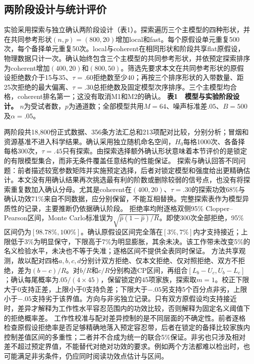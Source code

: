 \subsection{两阶段设计与统计评价}
实验采用探索与独立确认两阶段设计（表1）。探索遍历三个主模型的四种形状，并在共同参考形状$(n,p)=(800,20)$增加local和fast。每个原假设单元重复500次，每个备择单元重复50次。local与coherent在相同形状和阶段共享flat原假设，物理数据只计一次。确认始终包含三个主模型的共同参考形状，并依预定探索排序为coherent增加$(400,20)$和$(800,50)$。筛选先要求本文在共同参考形状的原假设拒绝数介于15与35、$\tau=.60$拒绝数至少40；再按三个排序形状的入带数量、距25次拒绝的最大偏离、$\tau=.30$总拒绝数及固定模型次序排序。三个主模型均合格，coherent排名第一；这没有取消M1和M2的确认。
\textbf{表1　模型与实验阶段设计。} $n$为受试者数，$p$为通道数；全部模型共用$M=64$、噪声标准差$.05$、$B=500$及$\alpha=.05$。

两阶段共18,800份正式数据、356条方法汇总和213项配对比较，分别分析；冒烟和资源基准不进入科学结果。确认采用独立随机命名空间，$H_0$每格1000次、各备择每格300次，$\tau=.45$只有探索。由探索选择额外确认形状意味着本节评价的是锁定的有限模型集合，而非无条件覆盖任意结构的性能保证。
探索与确认回答不同问题：前者描述较宽参数矩阵并实施预定选择，后者对锁定模型和强度给出更精确估计。本文没有用确认结果再次挑选最有利的阶数或删除较弱的信号点，也没有将探索重复数加入确认分母。尤其是coherent在$(400,20)$、$\tau=.30$的探索功效68\%与确认功效71\%来自不同数据，应分别保留，不能互相替换。完整探索表作为模型异质性的记录，主要推断仍依据确认阶段。
拒绝率均附逐格双侧95\% Clopper–Pearson区间，Monte Carlo标准误为$\sqrt{\widehat p(1-\widehat p)/R}$。即使300次全部拒绝，95\%区间仍为$[98.78\%,100\%]$。确认原假设区间完全落在$[3\%,7\%]$内才支持接近；上限低于3\%为明显保守，下限高于7\%为明显膨胀，其余未决。该工作带未改变5\%的名义检验水平，未决也不等于失准；逐格区间不提供全表同时保证。
方法共享观测，故以配对四格$a,b,c,d$分别计双方拒绝、仅本文拒绝、仅对照拒绝、双方不拒绝，差为$(b-c)/R$。对$b/R$和$c/R$分别构造CP区间，再组合$[L_b-U_c,U_b-L_c]$；确认每尾概率为$.05/(4\times45)$，保留锁定的45项家族，探索取$m=1$。校正下限大于0支持正差，上限小于0支持负差；下限大于$-.05$另支持5个百分点非劣，上限小于$-.05$支持劣于该界值。方向与非劣独立记录。只有双方原假设均支持接近时，差异才解释为工作性水平容忍范围内的功效比较，否则解释为固定名义阈值下的拒绝概率差。
工作性校准与配对差异控制的是不同层面的不确定性。前者逐格检查原假设拒绝率是否足够精确地落入预定容忍带，后者在锁定的备择比较家族内控制差值区间的多重性；二者并不合成为统一的联合5\%保证。非劣也只涉及相对差不超过预定界值，不能替代对绝对功效的要求。例如两个方法都难以检出时，也可能满足非劣条件，仍应同时阅读功效点估计与区间。
